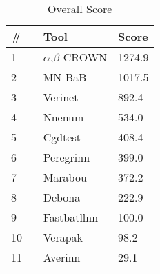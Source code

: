 

\begin{table}[h]
\begin{center}
\caption{Overall Score} \label{tab:score}
{\setlength{\tabcolsep}{2pt}
\begin{tabular}[h]{@{}lll@{}}
\toprule
\textbf{\# ~} & \textbf{Tool} & \textbf{Score}\\
\midrule
1 & $\alpha$,$\beta$-CROWN & 1274.9 \\
2 & MN BaB & 1017.5 \\
3 & Verinet & 892.4 \\
4 & Nnenum & 534.0 \\
5 & Cgdtest & 408.4 \\
6 & Peregrinn & 399.0 \\
7 & Marabou & 372.2 \\
8 & Debona & 222.9 \\
9 & Fastbatllnn & 100.0 \\
10 & Verapak & 98.2 \\
11 & Averinn & 29.1 \\
\bottomrule
\end{tabular}
}
\end{center}
\end{table}


